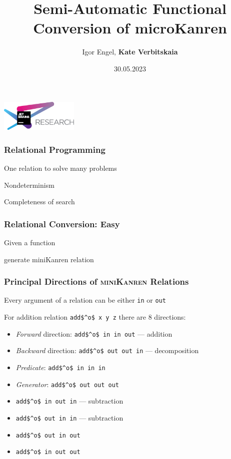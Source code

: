 \documentclass[xcolor=table]{beamer}
\title[Functional Conversion of microKanren]{Semi-Automatic Functional Conversion of microKanren}
\institute[JetBrains Research]{
JetBrains Research, Programming Languages and Tools Lab
}
\author[Kate Verbitskaia]{Igor Engel, \textbf{Kate Verbitskaia}}
\date{30.05.2023}
\newcommand{\mk}{\textsc{miniKanren}\xspace}
\begin{document}
{
\begin{frame}[fragile]
   \begin{center}
      \includegraphics[height=1.5cm]{pictures/jetbrainsResearch.pdf}
    \end{center}
  \titlepage
\end{frame}
}


\begin{frame}[fragile]
  \frametitle{Relational Programming}
\begin{center}
One relation to solve many problems
\end{center}

\begin{center}
Nondeterminism
\end{center}

\begin{center}
Completeness of search
\end{center}

\end{frame}

\begin{frame}[fragile]
  \frametitle{Relational Conversion: Easy}
Given a function


generate miniKanren relation

\end{frame}


\begin{frame}[fragile]
  \frametitle{Principal Directions of \mk Relations}
\begin{center}
  Every argument of a relation can be either \lstinline{in} or \lstinline{out}
\end{center}

\begin{center}
  For addition relation \lstinline{add$^o$ x y z} there are 8 directions:
\end{center}

\begin{itemize}
  \item \emph{Forward} direction: \lstinline{add$^o$ in in out} --- addition
  \item \emph{Backward} direction: \lstinline{add$^o$ out out in} --- decomposition
  \item \emph{Predicate}: \lstinline{add$^o$ in in in}
  \item \emph{Generator}: \lstinline{add$^o$ out out out}
  \item \lstinline{add$^o$ in out in} --- subtraction
  \item \lstinline{add$^o$ out in in} --- subtraction
  \item \lstinline{add$^o$ out in out}
  \item \lstinline{add$^o$ in out out}
\end{itemize}
\end{frame}
\end{document}
